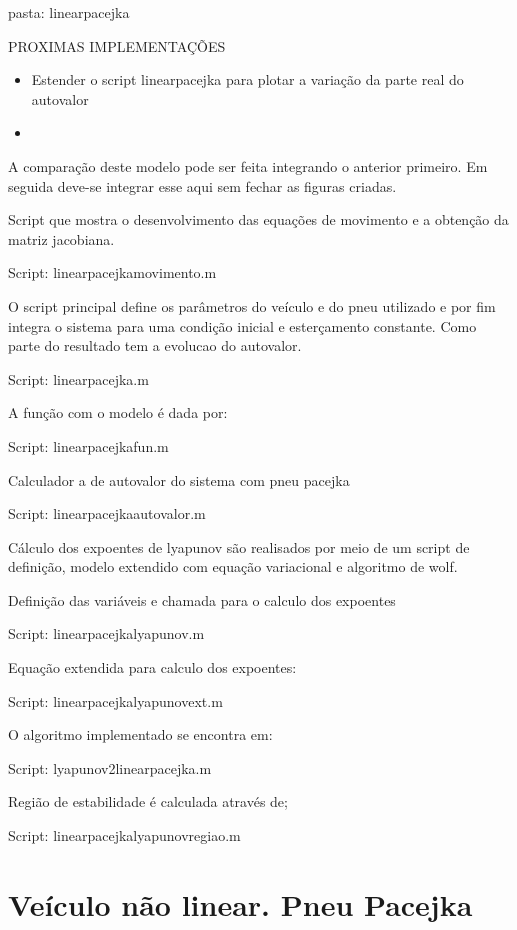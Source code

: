 \documentclass[sublist]{fei}
\begin{document}
pasta: linearpacejka

PROXIMAS IMPLEMENTAÇÕES

\begin{itemize}
\item Estender o script linearpacejka para plotar a variação da parte real do autovalor
\item 
\end{itemize}


A comparação deste modelo pode ser feita integrando o anterior primeiro. Em seguida deve-se integrar esse aqui sem fechar as figuras criadas.

Script que mostra o desenvolvimento das equações de movimento e a obtenção da matriz jacobiana. 

Script: linearpacejkamovimento.m

O script principal define os parâmetros do veículo e do pneu utilizado e por fim integra o sistema para uma condição inicial e esterçamento constante. Como parte do resultado tem a evolucao do autovalor.

	Script: linearpacejka.m

A função com o modelo é dada por:

	Script: linearpacejkafun.m

Calculador a de autovalor do sistema com pneu pacejka

	Script: linearpacejkaautovalor.m

Cálculo dos expoentes de lyapunov são realisados por meio de um script de definição, modelo extendido com equação variacional e algoritmo de wolf.

Definição das variáveis e chamada para o calculo dos expoentes

	Script: linearpacejkalyapunov.m

Equação extendida para calculo dos expoentes:

	Script: linearpacejkalyapunovext.m

O algoritmo implementado se encontra em:

Script: lyapunov2linearpacejka.m

Região de estabilidade é calculada através de;

	Script: linearpacejkalyapunovregiao.m








\chapter{Veículo não linear. Pneu Pacejka} 
\end{document}
